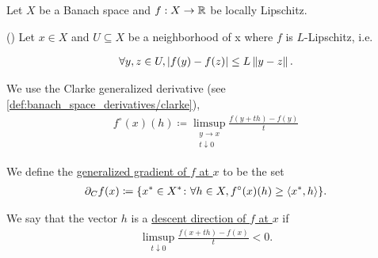 Let $X$ be a Banach space and $f: X \to \mathbb{R}$ be locally Lipschitz.

\begin{definition}\label{def:clarke_gradient}(\cite[Definition 10.3]{Clarke2013})
  Let $x \in X$ and $U \subseteq X$ be a neighborhood of x where $f$ is $L$-Lipschitz, i.e.

  \begin{align*}
    \forall y, z \in U, \left\vert f(y) - f(z) \right\vert \leq L \left\Vert y - z \right\Vert.
  \end{align*}

  We use the Clarke generalized derivative (see \cref{def:banach_space_derivatives/clarke}),
  \begin{align*}
    f^\circ(x)(h) \coloneqq \limsup_{\substack{y \to x \\ t \downarrow 0}} \frac {f(y + th) - f(y)} t
  \end{align*}

  We define the \uline{generalized gradient of $f$ at $x$} to be the set
  \begin{align*}
    \partial_C f(x) \coloneqq \{ x^* \in X^* \colon \forall h \in X, f^\circ(x)(h) \geq \left\langle x^*, h \right\rangle \}.
  \end{align*}

  We say that the vector $h$ is a \uline{descent direction of $f$ at $x$} if
  \begin{align*}
    \limsup_{t \downarrow 0} \frac {f(x + th) - f(x)} t < 0.
  \end{align*}
\end{definition}

